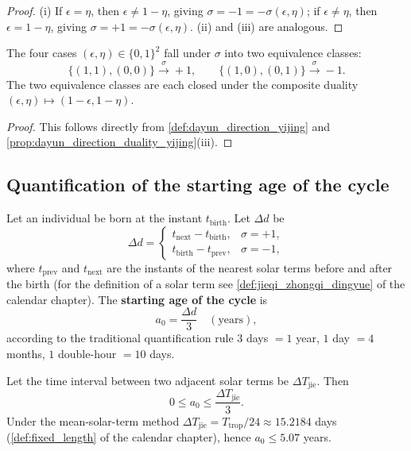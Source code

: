 \begin{proof}
(i) If $\epsilon=\eta$, then $\epsilon\neq 1-\eta$, giving $\sigma=-1=-\sigma(\epsilon,\eta)$; if $\epsilon\neq\eta$, then $\epsilon=1-\eta$, giving $\sigma=+1=-\sigma(\epsilon,\eta)$. (ii) and (iii) are analogous.
\end{proof}

\begin{corollary}\label{cor:dayun_direction_classes_yijing}
The four cases $(\epsilon,\eta)\in\{0,1\}^2$ fall under $\sigma$ into two equivalence classes:
\[
\{(1,1),(0,0)\}\xrightarrow{\sigma}+1,\qquad \{(1,0),(0,1)\}\xrightarrow{\sigma}-1.
\]
The two equivalence classes are each closed under the composite duality $(\epsilon,\eta)\mapsto(1-\epsilon,1-\eta)$.
\end{corollary}

\begin{proof}
This follows directly from \cref{def:dayun_direction_yijing} and \cref{prop:dayun_direction_duality_yijing}(iii).
\end{proof}

\subsection{Quantification of the starting age of the cycle}

\begin{definition}\label{def:qiyun_age_yijing}
Let an individual be born at the instant $t_{\text{birth}}$. Let $\Delta d$ be
\[
\Delta d=\begin{cases}t_{\text{next}}-t_{\text{birth}},&\sigma=+1,\\t_{\text{birth}}-t_{\text{prev}},&\sigma=-1,\end{cases}
\]
where $t_{\text{prev}}$ and $t_{\text{next}}$ are the instants of the nearest solar terms before and after the birth (for the definition of a solar term see \cref{def:jieqi_zhongqi_dingyue} of the calendar chapter). The \textbf{starting age of the cycle} is
\[
a_0=\frac{\Delta d}{3}\quad(\text{years}),
\]
according to the traditional quantification rule $3$ days $=1$ year, $1$ day $=4$ months, $1$ double-hour $=10$ days.
\end{definition}

\begin{proposition}\label{prop:qiyun_age_bound_yijing}
Let the time interval between two adjacent solar terms be $\Delta T_{\text{jie}}$. Then
\[
0\le a_0\le \frac{\Delta T_{\text{jie}}}{3}.
\]
Under the mean-solar-term method $\Delta T_{\text{jie}}=T_{\text{trop}}/24\approx 15.2184$ days (\cref{def:fixed_length} of the calendar chapter), hence $a_0\le 5.07$ years.
\end{proposition}

